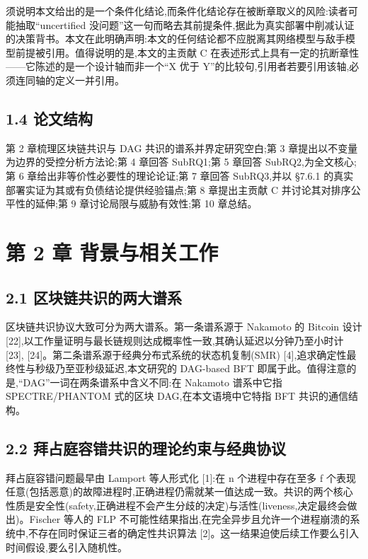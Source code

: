 \documentclass[UTF8,fontset=windows,a4paper,11pt]{ctexart}
\begin{document}
须说明本文给出的是一个条件化结论,而条件化结论存在被断章取义的风险:读者可能抽取``uncertified
没问题''这一句而略去其前提条件,据此为真实部署中削减认证的决策背书。本文在此明确声明:本文的任何结论都不应脱离其网络模型与敌手模型前提被引用。值得说明的是,本文的主贡献
C 在表述形式上具有一定的抗断章性------它陈述的是一个设计轴而非一个``X
优于 Y''的比较句,引用者若要引用该轴,必须连同轴的定义一并引用。

\subsection{1.4 论文结构}\label{ux8bbaux6587ux7ed3ux6784}

第 2 章梳理区块链共识与 DAG 共识的谱系并界定研究空白;第 3
章提出以不变量为边界的受控分析方法论;第 4 章回答 SubRQ1;第 5 章回答
SubRQ2,为全文核心;第 6 章给出非等价性必要性的理论论证;第 7 章回答
SubRQ3,并以 §7.6.1 的真实部署实证为其或有负债结论提供经验锚点;第 8
章提出主贡献 C 并讨论其对排序公平性的延伸;第 9 章讨论局限与威胁有效性;第
10 章总结。

\section{第 2 章
背景与相关工作}\label{ux7b2c-2-ux7ae0-ux80ccux666fux4e0eux76f8ux5173ux5de5ux4f5c}

\subsection{2.1
区块链共识的两大谱系}\label{ux533aux5757ux94feux5171ux8bc6ux7684ux4e24ux5927ux8c31ux7cfb}

区块链共识协议大致可分为两大谱系。第一条谱系源于 Nakamoto 的 Bitcoin
设计 {[}22{]},以工作量证明与最长链规则达成概率性一致,其确认延迟以分钟乃至小时计 {[}23{]}, {[}24{]}。第二条谱系源于经典分布式系统的状态机复制(SMR) {[}4{]},追求确定性最终性与秒级乃至亚秒级延迟,本文研究的 DAG-based BFT 即属于此。值得注意的是,``DAG''一词在两条谱系中含义不同:在 Nakamoto 谱系中它指 SPECTRE/PHANTOM 式的区块 DAG,在本文语境中它特指 BFT 共识的通信结构。

\subsection{2.2
拜占庭容错共识的理论约束与经典协议}\label{ux62dcux5360ux5eadux5bb9ux9519ux5171ux8bc6ux7684ux7406ux8bbaux7ea6ux675fux4e0eux7ecfux5178ux534fux8bae}

拜占庭容错问题最早由 Lamport 等人形式化 {[}1{]}:在 n 个进程中存在至多 f
个表现任意(包括恶意)的故障进程时,正确进程仍需就某一值达成一致。共识的两个核心性质是安全性(safety,正确进程不会产生分歧的决定)与活性(liveness,决定最终会做出)。Fischer
等人的 FLP
不可能性结果指出,在完全异步且允许一个进程崩溃的系统中,不存在同时保证三者的确定性共识算法
{[}2{]}。这一结果迫使后续工作要么引入时间假设,要么引入随机性。
\end{document}
